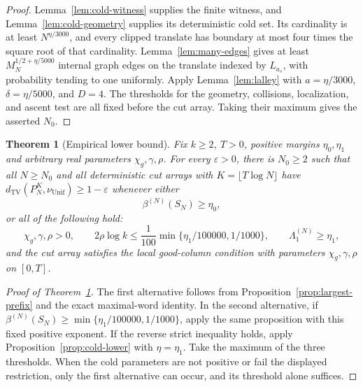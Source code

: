 \documentclass[11pt]{article}
\numberwithin{equation}{section}
\newtheorem{theorem}{Theorem}[section]
\theoremstyle{definition}
\theoremstyle{remark}
\newcommand{\TV}{\mathrm{TV}}
\newcommand{\Unif}{\mathrm{Unif}}
\newcommand{\dTV}{d_{\TV}}
\newcommand{\nuUnif}{\nu_{\Unif}}
\newcommand{\1}{\mathbf 1}
\begin{document}
\begin{proof}
Lemma~\ref{lem:cold-witness} supplies the finite witness, and
Lemma~\ref{lem:cold-geometry} supplies its deterministic cold set. Its
cardinality is at least $N^{\eta/3000}$, and every clipped translate has
boundary at most four times the square root of that cardinality.
Lemma~\ref{lem:many-edges} gives at least $M_N^{1/2+\eta/5000}$ internal
graph edges on the translate indexed by $L_{a_s}$, with probability tending
to one uniformly. Apply Lemma~\ref{lem:lalley} with $a=\eta/3000$,
$\delta=\eta/5000$, and $D=4$. The thresholds for the geometry, collisions,
localization, and ascent test are all fixed before the cut array. Taking
their maximum gives the asserted $N_0$.
\end{proof}



\begin{theorem}[Empirical lower bound]%
\label{thm:empirical-lower}
Fix $k\ge2$, $T>0$, positive margins $\eta_0,\eta_1$ and arbitrary real parameters
$\chi_g,\gamma,\rho$. For every $\varepsilon>0$, there is $N_0\ge2$ such
that all $N\ge N_0$ and all deterministic cut arrays with $K=\lfloor T\log N\rfloor$ have
$\dTV(P_N^K,\nuUnif)\ge1-\varepsilon$ whenever either
\[
 \beta^{(N)}(S_N)\ge\eta_0,
\]
or all of the following hold:
\[
 \chi_g,\gamma,\rho>0,\qquad
 2\rho\log k\le\frac1{100}\min\{\eta_1/100000,1/1000\},\qquad
 \Lambda_1^{(N)}\ge\eta_1,
\]
and the cut array satisfies the local good-column condition with
parameters $\chi_g,\gamma,\rho$ on $[0,T]$.
\end{theorem}

\begin{proof}[Proof of Theorem~\ref{thm:empirical-lower}]
The first alternative follows from Proposition~\ref{prop:largest-prefix}
and the exact maximal-word identity. In the second alternative, if
$\beta^{(N)}(S_N)\ge\min\{\eta_1/100000,1/1000\}$, apply the same
proposition with this fixed positive exponent. If the reverse strict
inequality holds, apply Proposition~\ref{prop:cold-lower} with
$\eta=\eta_1$. Take the maximum of the three thresholds. When the cold
parameters are not positive or fail the displayed restriction, only the
first alternative can occur, and its threshold alone suffices.
\end{proof}
\end{document}
